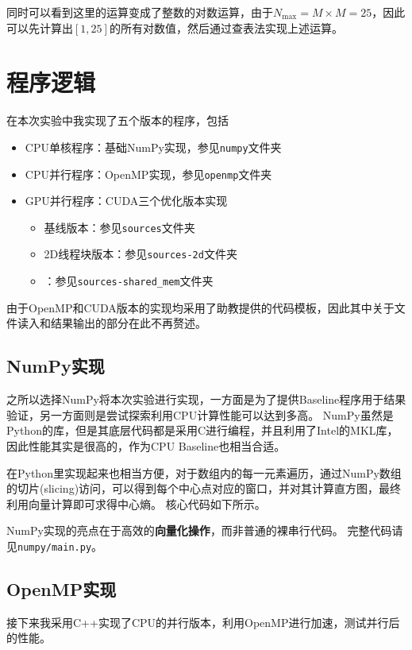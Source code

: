 \documentclass[logo,reportComp]{thesis}
\def\sharedmem{\textcolor{red}{\kaiti 共享内存}}
\begin{document}
同时可以看到这里的运算变成了整数的对数运算，由于$N_{\max}=M\times M=25$，因此可以先计算出$[1,25]$的所有对数值，然后通过查表法实现上述运算。

\section{程序逻辑}
\label{sec:prog}
在本次实验中我实现了五个版本的程序，包括
\begin{itemize}
\item CPU单核程序：基础NumPy实现，参见\verb'numpy'文件夹
\item CPU并行程序：OpenMP实现，参见\verb'openmp'文件夹
\item GPU并行程序：CUDA三个优化版本实现
\begin{itemize}
\item 基线版本：参见\verb'sources'文件夹
\item 2D线程块版本：参见\verb'sources-2d'文件夹
\item {}：参见\verb'sources-shared_mem'文件夹
\end{itemize}
\end{itemize}

由于OpenMP和CUDA版本的实现均采用了助教提供的代码模板，因此其中关于文件读入和结果输出的部分在此不再赘述。

\subsection{NumPy实现}
之所以选择NumPy将本次实验进行实现，一方面是为了提供Baseline程序用于结果验证，另一方面则是尝试探索利用CPU计算性能可以达到多高。
NumPy虽然是Python的库，但是其底层代码都是采用C进行编程，并且利用了Intel的MKL库，因此性能其实是很高的，作为CPU Baseline也相当合适。

在Python里实现起来也相当方便，对于数组内的每一元素遍历，通过NumPy数组的切片(slicing)访问，可以得到每个中心点对应的窗口，并对其计算直方图，最终利用向量计算即可求得中心熵。
核心代码如下所示。


NumPy实现的亮点在于高效的\textbf{向量化操作}，而非普通的裸串行代码。
完整代码请见\verb'numpy/main.py'。

\subsection{OpenMP实现}
\label{sub:openmp}
接下来我采用C++实现了CPU的并行版本，利用OpenMP进行加速，测试并行后的性能。
\end{document}
